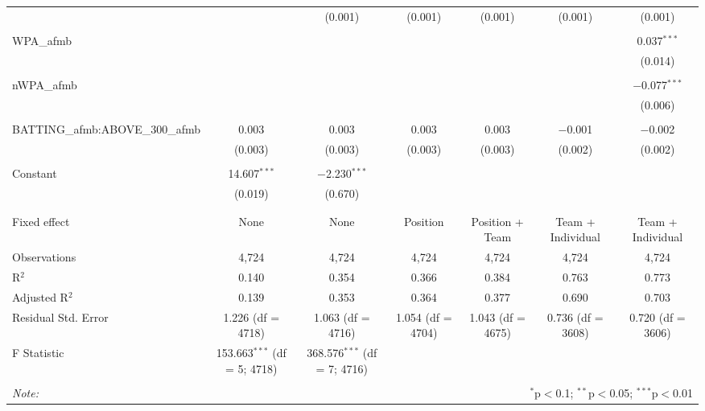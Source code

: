 \begin{table}[!htbp]
\begin{tabular}{@{\extracolsep{5pt}}lcccccc}
  &  & (0.001) & (0.001) & (0.001) & (0.001) & (0.001) \\
  & & & & & & \\
 WPA\_afmb &  &  &  &  &  & 0.037$^{***}$ \\
  &  &  &  &  &  & (0.014) \\
  & & & & & & \\
 nWPA\_afmb &  &  &  &  &  & $-$0.077$^{***}$ \\
  &  &  &  &  &  & (0.006) \\
  & & & & & & \\
 BATTING\_afmb:ABOVE\_300\_afmb & 0.003 & 0.003 & 0.003 & 0.003 & $-$0.001 & $-$0.002 \\
  & (0.003) & (0.003) & (0.003) & (0.003) & (0.002) & (0.002) \\
  & & & & & & \\
 Constant & 14.607$^{***}$ & $-$2.230$^{***}$ &  &  &  &  \\
  & (0.019) & (0.670) &  &  &  &  \\
  & & & & & & \\
\hline \\[-1.8ex]
Fixed effect & None & None & Position & Position + Team & Team + Individual & Team + Individual \\
Observations & 4,724 & 4,724 & 4,724 & 4,724 & 4,724 & 4,724 \\
R$^{2}$ & 0.140 & 0.354 & 0.366 & 0.384 & 0.763 & 0.773 \\
Adjusted R$^{2}$ & 0.139 & 0.353 & 0.364 & 0.377 & 0.690 & 0.703 \\
Residual Std. Error & 1.226 (df = 4718) & 1.063 (df = 4716) & 1.054 (df = 4704) & 1.043 (df = 4675) & 0.736 (df = 3608) & 0.720 (df = 3606) \\
F Statistic & 153.663$^{***}$ (df = 5; 4718) & 368.576$^{***}$ (df = 7; 4716) &  &  &  &  \\
\hline
\hline \\[-1.8ex]
\textit{Note:}  & \multicolumn{6}{r}{$^{*}$p$<$0.1; $^{**}$p$<$0.05; $^{***}$p$<$0.01} \\
\end{tabular}
\end{table}

